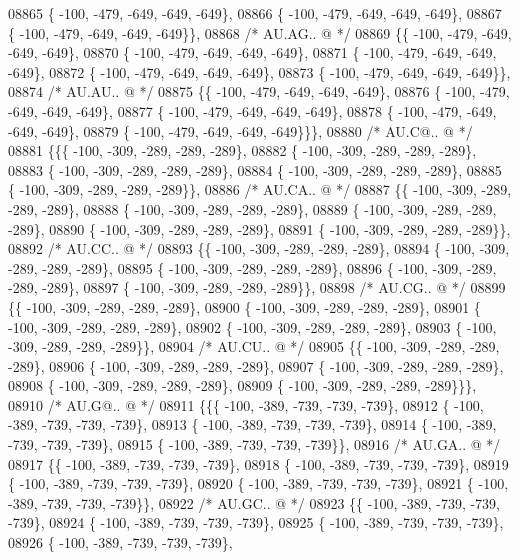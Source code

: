 \begin{DoxyCode}
08865 \{ -100, -479, -649, -649, -649\},
08866 \{ -100, -479, -649, -649, -649\},
08867 \{ -100, -479, -649, -649, -649\}\},
08868 \textcolor{comment}{/* AU.AG.. @ */}
08869 \{\{ -100, -479, -649, -649, -649\},
08870 \{ -100, -479, -649, -649, -649\},
08871 \{ -100, -479, -649, -649, -649\},
08872 \{ -100, -479, -649, -649, -649\},
08873 \{ -100, -479, -649, -649, -649\}\},
08874 \textcolor{comment}{/* AU.AU.. @ */}
08875 \{\{ -100, -479, -649, -649, -649\},
08876 \{ -100, -479, -649, -649, -649\},
08877 \{ -100, -479, -649, -649, -649\},
08878 \{ -100, -479, -649, -649, -649\},
08879 \{ -100, -479, -649, -649, -649\}\}\},
08880 \textcolor{comment}{/* AU.C@.. @ */}
08881 \{\{\{ -100, -309, -289, -289, -289\},
08882 \{ -100, -309, -289, -289, -289\},
08883 \{ -100, -309, -289, -289, -289\},
08884 \{ -100, -309, -289, -289, -289\},
08885 \{ -100, -309, -289, -289, -289\}\},
08886 \textcolor{comment}{/* AU.CA.. @ */}
08887 \{\{ -100, -309, -289, -289, -289\},
08888 \{ -100, -309, -289, -289, -289\},
08889 \{ -100, -309, -289, -289, -289\},
08890 \{ -100, -309, -289, -289, -289\},
08891 \{ -100, -309, -289, -289, -289\}\},
08892 \textcolor{comment}{/* AU.CC.. @ */}
08893 \{\{ -100, -309, -289, -289, -289\},
08894 \{ -100, -309, -289, -289, -289\},
08895 \{ -100, -309, -289, -289, -289\},
08896 \{ -100, -309, -289, -289, -289\},
08897 \{ -100, -309, -289, -289, -289\}\},
08898 \textcolor{comment}{/* AU.CG.. @ */}
08899 \{\{ -100, -309, -289, -289, -289\},
08900 \{ -100, -309, -289, -289, -289\},
08901 \{ -100, -309, -289, -289, -289\},
08902 \{ -100, -309, -289, -289, -289\},
08903 \{ -100, -309, -289, -289, -289\}\},
08904 \textcolor{comment}{/* AU.CU.. @ */}
08905 \{\{ -100, -309, -289, -289, -289\},
08906 \{ -100, -309, -289, -289, -289\},
08907 \{ -100, -309, -289, -289, -289\},
08908 \{ -100, -309, -289, -289, -289\},
08909 \{ -100, -309, -289, -289, -289\}\}\},
08910 \textcolor{comment}{/* AU.G@.. @ */}
08911 \{\{\{ -100, -389, -739, -739, -739\},
08912 \{ -100, -389, -739, -739, -739\},
08913 \{ -100, -389, -739, -739, -739\},
08914 \{ -100, -389, -739, -739, -739\},
08915 \{ -100, -389, -739, -739, -739\}\},
08916 \textcolor{comment}{/* AU.GA.. @ */}
08917 \{\{ -100, -389, -739, -739, -739\},
08918 \{ -100, -389, -739, -739, -739\},
08919 \{ -100, -389, -739, -739, -739\},
08920 \{ -100, -389, -739, -739, -739\},
08921 \{ -100, -389, -739, -739, -739\}\},
08922 \textcolor{comment}{/* AU.GC.. @ */}
08923 \{\{ -100, -389, -739, -739, -739\},
08924 \{ -100, -389, -739, -739, -739\},
08925 \{ -100, -389, -739, -739, -739\},
08926 \{ -100, -389, -739, -739, -739\},

\end{DoxyCode}
